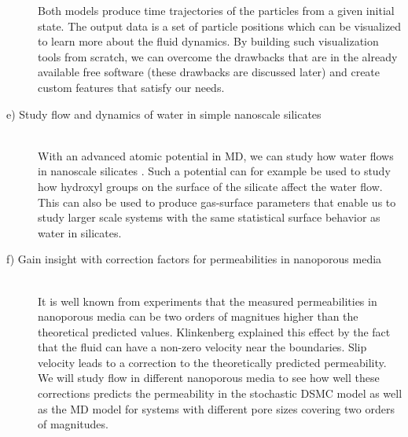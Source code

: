 \begin{description}
  Both models produce time trajectories of the particles from a given initial state. The output data is a set of particle positions which can be visualized to learn more about the fluid dynamics. By building such visualization tools from scratch, we can overcome the drawbacks that are in the already available free software (these drawbacks are discussed later) and create custom features that satisfy our needs. 
  \item[e) Study flow and dynamics of water in simple nanoscale silicates] \hfill \\
  With an advanced atomic potential in MD, we can study how water flows in nanoscale silicates \cite{vashishta1990interaction}. Such a potential can for example be used to study how hydroxyl groups on the surface of the silicate affect the water flow. This can also be used to produce gas-surface parameters that enable us to study larger scale systems with the same statistical surface behavior as water in silicates. 
  \item[f) Gain insight with correction factors for permeabilities in nanoporous media] \hfill \\
  It is well known from experiments that the measured permeabilities in nanoporous media can be two orders of magnitues higher than the theoretical predicted values. Klinkenberg explained this effect by the fact that the fluid can have a non-zero velocity near the boundaries\cite{klinkenberg1941permeability}. Slip velocity leads to a correction to the theoretically predicted permeability. We will study flow in different nanoporous media to see how well these corrections predicts the permeability in the stochastic DSMC model as well as the MD model for systems with different pore sizes covering two orders of magnitudes.\\
\end{description}

